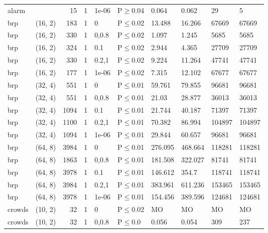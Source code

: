 \begin{longtable}{llrrllllll}
 alarm         &          &     	15 & 1 & 1e-06 & P$\geq$0.04  & 0.064   & 0.062    & 29     & 5      \\
 brp           & (16, 2)  &    	183 & 1 & 0     & P$\leq$0.02  & 13.488  & 16.266   & 67669  & 67669  \\
 brp           & (16, 2)  &    	330 & 1 & 0,0.8 & P$\leq$0.02  & 1.097   & 1.245    & 5685   & 5685   \\
 brp           & (16, 2)  &    	324 & 1 & 0.1   & P$\leq$0.02  & 2.944   & 4.365    & 27709  & 27709  \\
 brp           & (16, 2)  &    	330 & 1 & 0.2,1 & P$\leq$0.02  & 9.224   & 11.264   & 47741  & 47741  \\
 brp           & (16, 2)  &    	177 & 1 & 1e-06 & P$\leq$0.02  & 7.315   & 12.102   & 67677  & 67677  \\
 brp           & (32, 4)  &    	551 & 1 & 0     & P$\leq$0.01  & 59.761  & 79.855   & 96681  & 96681  \\
 brp           & (32, 4)  &    	551 & 1 & 0,0.8 & P$\leq$0.01  & 21.03   & 28.877   & 36013  & 36013  \\
 brp           & (32, 4)  &   	1094 & 1 & 0.1   & P$\leq$0.01  & 21.744  & 40.187   & 71397  & 71397  \\
 brp           & (32, 4)  &   	1100 & 1 & 0.2,1 & P$\leq$0.01  & 70.382  & 86.994   & 104897 & 104897 \\
 brp           & (32, 4)  &   	1094 & 1 & 1e-06 & P$\leq$0.01  & 29.844  & 60.657   & 96681  & 96681  \\
 brp           & (64, 8)  &   	3984 & 1 & 0     & P$\leq$0.01  & 276.095 & 468.664  & 118281 & 118281 \\
 brp           & (64, 8)  &   	1863 & 1 & 0,0.8 & P$\leq$0.01  & 181.508 & 322.027  & 81741  & 81741  \\
 brp           & (64, 8)  &   	3978 & 1 & 0.1   & P$\leq$0.01  & 146.612 & 354.7    & 118741 & 118741 \\
 brp           & (64, 8)  &   	3984 & 1 & 0.2,1 & P$\leq$0.01  & 383.961 & 611.236  & 153465 & 153465 \\
 brp           & (64, 8)  &   	3978 & 1 & 1e-06 & P$\leq$0.01  & 154.456 & 389.596  & 124681 & 124681 \\
 crowds        & (10, 2)  &     	32 & 1 & 0     & P$\leq$0.02  & MO      & MO       & MO     & MO     \\
 crowds        & (10, 2)  &     	32 & 1 & 0,0.8 & P$\leq$0.0   & 0.056   & 0.054    & 309    & 237    \\

\end{longtable}
